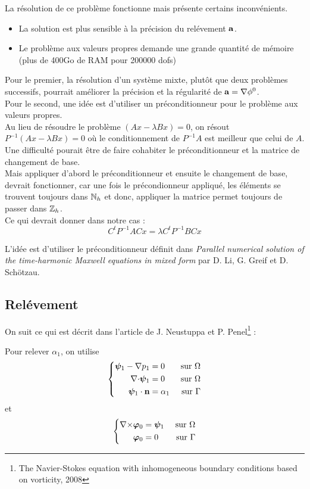 \documentclass[a4paper,11pt]{article}
\begin{document}
La résolution de ce problème fonctionne mais présente certains inconvénients.
\begin{itemize}
\item
  La solution est plus sensible à la précision du relévement ${\mathbf{a}}$.
\item
  Le problème aux valeurs propres demande une grande quantité de mémoire (plus de 400Go de RAM pour 200000 dofs)
\end{itemize}
Pour le premier, la résolution d'un système mixte, plutôt que deux problèmes successifs, pourrait améliorer la précision et la régularité de ${\mathbf{a}} = {\nabla}\phi^0$.\\
Pour le second, une idée est d'utiliser un préconditionneur pour le problème aux valeurs propres.\\
Au lieu de résoudre le problème $(Ax-\lambda Bx) = 0$, on résout $P^{-1}(Ax-\lambda Bx) = 0$ où le conditionnement de $P^{-1}A$ est meilleur que celui de $A$. Une difficulté pourait être de faire cohabiter le préconditionneur et la matrice de changement de base.\\
Mais appliquer d'abord le préconditionneur et ensuite le changement de base, devrait fonctionner, car une fois le précondionneur appliqué, les éléments se trouvent toujours dans ${\mathbb{N}}_h$ et donc, appliquer la matrice permet toujours de passer dans ${\mathbb{Z}}_h$.\\
Ce qui devrait donner dans notre cas :
\[ C^t P^{-1}ACx = \lambda C^t P^{-1}BCx \]

L'idée est d'utiliser le préconditionneur définit dans \textit{Parallel numerical solution of the time-harmonic Maxwell equations in mixed form} par D. Li, G. Greif et D. Schötzau.

\iffalse
\subsection{Relévement}
\label{relev}
On suit ce qui est décrit dans l'article de J. Neustuppa et P. Penel\footnote{The Navier-Stokes equation with inhomogeneous boundary conditions based on vorticity, 2008} :

Pour relever $\alpha_1$, on utilise
\begin{equation}\label{a1}
  \left\{
  \begin{aligned}
    \bm{\psi}_1 - {\nabla} p_1 &= 0 &\mbox{ sur }\Omega\\
    {\nabla\cdot}\bm{\psi}_1 &= 0 &\mbox{ sur }\Omega\\
    \bm{\psi}_1\cdot{\mathbf{n}} &= \alpha_1 &\mbox{ sur }\Gamma
  \end{aligned}
  \right.
\end{equation}
et
\begin{equation}
  \left\{
  \begin{aligned}
    {\nabla\times}\bm{\varphi}_0 &= \bm{\psi}_1 &\mbox{ sur }\Omega\\
    \bm{\varphi}_0 &= 0 &\mbox{ sur }\Gamma
  \end{aligned}
  \right.
\end{equation}
\end{document}
